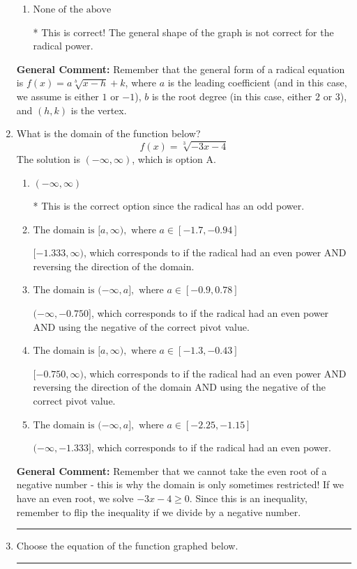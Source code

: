 \documentclass{extbook}[14pt]
\newcommand{\litem}[1]{\item #1

\rule{\textwidth}{0.4pt}}
\begin{document}
\begin{enumerate}
{\begin{enumerate}[label=\Alph*.]
This would be the correct option if the root degree was $3$.
\item \( \text{None of the above} \)

* This is correct! The general shape of the graph is not correct for the radical power.
\end{enumerate}

\textbf{General Comment:} Remember that the general form of a radical equation is $ f(x) = a \sqrt[b]{x - h} + k$, where $a$ is the leading coefficient (and in this case, we assume is either $1$ or $-1$), $b$ is the root degree (in this case, either $2$ or $3$), and $(h, k)$ is the vertex.
}
\litem{
What is the domain of the function below?
\[ f(x) = \sqrt[3]{-3 x - 4} \]The solution is \( (-\infty, \infty) \), which is option A.\begin{enumerate}[label=\Alph*.]
\item \( (-\infty, \infty) \)

* This is the correct option since the radical has an odd power.
\item \( \text{The domain is } [a, \infty), \text{   where } a \in [-1.7, -0.94] \)

$[-1.333, \infty)$, which corresponds to if the radical had an even power AND reversing the direction of the domain.
\item \( \text{The domain is } (-\infty, a], \text{   where } a \in [-0.9, 0.78] \)

$(-\infty, -0.750]$, which corresponds to if the radical had an even power AND using the negative of the correct pivot value.
\item \( \text{The domain is } [a, \infty), \text{   where } a \in [-1.3, -0.43] \)

$[-0.750, \infty)$, which corresponds to if the radical had an even power AND reversing the direction of the domain AND using the negative of the correct pivot value.
\item \( \text{The domain is } (-\infty, a], \text{   where } a \in [-2.25, -1.15] \)

$(-\infty, -1.333]$, which corresponds to if the radical had an even power.
\end{enumerate}

\textbf{General Comment:} Remember that we cannot take the even root of a negative number - this is why the domain is only sometimes restricted! If we have an even root, we solve $-3 x - 4 \geq 0$. Since this is an inequality, remember to flip the inequality if we divide by a negative number.
}
\litem{
Choose the equation of the function graphed below.

}
\end{enumerate}
\end{document}
